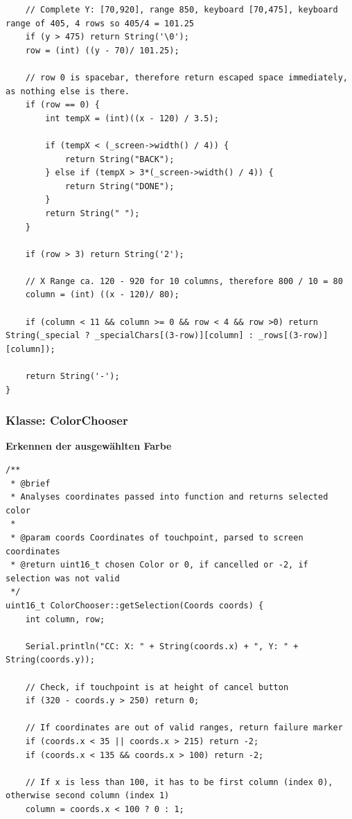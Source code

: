 \documentclass[a4paper, 11pt]{scrartcl}
\begin{document}
\begin{small}
\begin{lstlisting}
    // Complete Y: [70,920], range 850, keyboard [70,475], keyboard range of 405, 4 rows so 405/4 = 101.25
    if (y > 475) return String('\0');
    row = (int) ((y - 70)/ 101.25);

    // row 0 is spacebar, therefore return escaped space immediately, as nothing else is there.
    if (row == 0) {
        int tempX = (int)((x - 120) / 3.5);

        if (tempX < (_screen->width() / 4)) {
            return String("BACK");
        } else if (tempX > 3*(_screen->width() / 4)) {
            return String("DONE");
        }
        return String(" ");
    }

    if (row > 3) return String('2');

    // X Range ca. 120 - 920 for 10 columns, therefore 800 / 10 = 80
    column = (int) ((x - 120)/ 80);

    if (column < 11 && column >= 0 && row < 4 && row >0) return String(_special ? _specialChars[(3-row)][column] : _rows[(3-row)][column]);
    
    return String('-');
}
\end{lstlisting}

\subsubsection{Klasse: ColorChooser}
\begin{flushleft}\textbf{Erkennen der ausgewählten Farbe}\label{code:color}\end{flushleft}
\begin{lstlisting}
/**
 * @brief 
 * Analyses coordinates passed into function and returns selected color
 * 
 * @param coords Coordinates of touchpoint, parsed to screen coordinates
 * @return uint16_t chosen Color or 0, if cancelled or -2, if selection was not valid
 */
uint16_t ColorChooser::getSelection(Coords coords) {
    int column, row;

    Serial.println("CC: X: " + String(coords.x) + ", Y: " + String(coords.y));

    // Check, if touchpoint is at height of cancel button
    if (320 - coords.y > 250) return 0;

    // If coordinates are out of valid ranges, return failure marker
    if (coords.x < 35 || coords.x > 215) return -2;
    if (coords.x < 135 && coords.x > 100) return -2;

    // If x is less than 100, it has to be first column (index 0), otherwise second column (index 1)
    column = coords.x < 100 ? 0 : 1;


\end{lstlisting}
\end{small}
\end{document}
